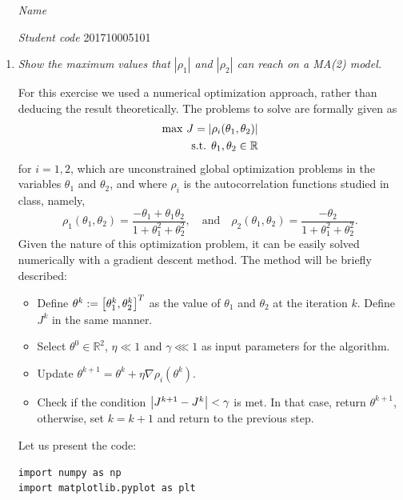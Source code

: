 \documentclass[fleqn]{article}
\newcommand{\RR}{{\mathbb{R}}}
\let\originalleft\left
\let\originalright\right
\renewcommand{\left}{\mathopen{}\mathclose\bgroup\originalleft}
\renewcommand{\right}{\aftergroup\egroup\originalright}
\newcommand{\abs}[1]{\left\lvert#1\right\rvert}
\begin{document}
 \vspace{0.3cm}
   \begin{itemize}[leftmargin=6.25cm, labelsep=0.5cm]

     \item[\textit{Name}]  %
     \item[\textit{Student code}] 201710005101 %

   \end{itemize}
\vspace{0.3cm}

\begin{enumerate}
\item \textit{Show the maximum values that $|\rho_1|$ and $|\rho_2|$ can reach on a MA(2) model.}

For this exercise we used a numerical optimization approach, rather than deducing the result theoretically. The problems to solve are formally given as 
\begin{equation}
\begin{split}
\mathrm{max} \ J=\abs{\rho_i(\theta_1, \theta_2)}\\
\text{s.t. } \theta_1,\theta_2\in\RR
\end{split}
\end{equation}
for $i=1,2$, which are unconstrained global optimization problems in the variables $\theta_1$ and $\theta_2$, and where $\rho_i$ is the autocorrelation functions studied in class, namely,
\begin{equation}
    \rho_1(\theta_1, \theta_2) = \dfrac{-\theta_1+\theta_1\theta_2}{1+\theta^2_1+\theta_2^2},\quad \text{and}\quad \rho_2(\theta_1, \theta_2) = \dfrac{-\theta_2}{1+\theta^2_1+\theta_2^2}.
\end{equation}
Given the nature of this optimization problem, it can be easily solved numerically with a gradient descent method. The method will be briefly described:
\begin{itemize}
    \item Define $\theta^k:=\left[\theta_1^k,\theta_2^k\right]^T$ as the value of $\theta_1$ and $\theta_2$ at the iteration $k$. Define $J^k$ in the same manner.
    \item Select $\theta^0\in\RR^2$, $\eta\ll 1$ and $\gamma\lll 1$ as input parameters for the algorithm.
    \item Update $\theta^{k+1}=\theta^{k}+\eta\nabla\rho_i(\theta^k)$.
    \item Check if the condition $\abs{J^{k+1}-J^k}<\gamma$ is met. In that case, return $\theta^{k+1}$, otherwise, set $k=k+1$ and return to the previous step.
\end{itemize}
Let us present the code:
\begin{verbatim}
import numpy as np
import matplotlib.pyplot as plt


\end{verbatim}
\end{enumerate}
\end{document}
